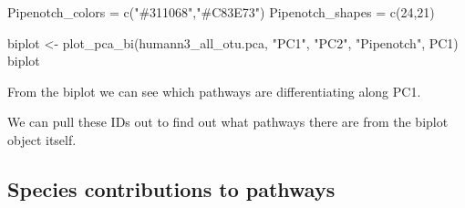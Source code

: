 \documentclass[
  letterpaper,
]{book}
\newenvironment{Shaded}{}{}
\newcommand{\AttributeTok}[1]{\textcolor[rgb]{0.84,0.23,0.29}{#1}}
\newcommand{\CommentTok}[1]{\textcolor[rgb]{0.42,0.45,0.49}{#1}}
\newcommand{\DecValTok}[1]{\textcolor[rgb]{0.00,0.36,0.77}{#1}}
\newcommand{\FunctionTok}[1]{\textcolor[rgb]{0.44,0.26,0.76}{#1}}
\newcommand{\NormalTok}[1]{\textcolor[rgb]{0.14,0.16,0.18}{#1}}
\newcommand{\OtherTok}[1]{\textcolor[rgb]{0.44,0.26,0.76}{#1}}
\newcommand{\SpecialCharTok}[1]{\textcolor[rgb]{0.00,0.36,0.77}{#1}}
\newcommand{\StringTok}[1]{\textcolor[rgb]{0.01,0.18,0.38}{#1}}
\begin{document}
\begin{Shaded}
\begin{Highlighting}[]
\NormalTok{Pipenotch\_colors }\OtherTok{=} \FunctionTok{c}\NormalTok{(}\StringTok{"\#311068"}\NormalTok{,}\StringTok{"\#C83E73"}\NormalTok{)}
\NormalTok{Pipenotch\_shapes }\OtherTok{=} \FunctionTok{c}\NormalTok{(}\DecValTok{24}\NormalTok{,}\DecValTok{21}\NormalTok{)}

\NormalTok{biplot }\OtherTok{\textless{}{-}} \FunctionTok{plot\_pca\_bi}\NormalTok{(humann3\_all\_otu.pca, }\StringTok{"PC1"}\NormalTok{, }\StringTok{"PC2"}\NormalTok{, }\StringTok{"Pipenotch"}\NormalTok{, PC1)}
\NormalTok{biplot}
\end{Highlighting}
\end{Shaded}

From the biplot we can see which pathways are differentiating along PC1.

We can pull these IDs out to find out what pathways there are from the
biplot object itself.

\begin{Shaded}
\end{Shaded}

\hypertarget{species-contributions-to-pathways}{%
\subsection{Species contributions to
pathways}\label{species-contributions-to-pathways}}
\end{document}

